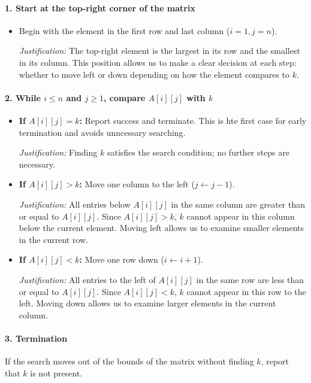 \documentclass[12pt]{article}
\begin{document}
\begin{enumerate}
\paragraph{1. Start at the top-right corner of the matrix}  

\begin{itemize}
    \item Begin with the element in the first row and last column (\(i=1, j=n\)).

    \emph{Justification:} The top-right element is the largest in its row and the smallest in its column. This position allows us to make a clear decision at each step: whether to move left or down depending on how the element compares to \(k\).
    
\end{itemize}

\paragraph{2. While \(i \le n\) and \(j \ge 1\), compare \(A[i][j]\) with \(k\)}

\begin{itemize}
\item \textbf{If \(A[i][j] = k\):} Report success and terminate. This is hte first case for early termination and avoids unncessary searching.

\emph{Justification:} Finding \(k\) satisfies the search condition; no further steps are necessary.
  
\item \textbf{If \(A[i][j] > k\):} Move one column to the left (\(j \gets j-1\)).  

\emph{Justification:}  
All entries below \(A[i][j]\) in the same column are greater than or equal to \(A[i][j]\). Since \(A[i][j] > k\), \(k\) cannot appear in this column below the current element. Moving left allows us to examine smaller elements in the current row.
  
\item \textbf{If \(A[i][j] < k\):} Move one row down (\(i \gets i+1\)).  

\emph{Justification:}  
All entries to the left of \(A[i][j]\) in the same row are less than or equal to \(A[i][j]\). Since \(A[i][j] < k\), \(k\) cannot appear in this row to the left. Moving down allows us to examine larger elements in the current column.
\end{itemize}

\paragraph{3. Termination}  
If the search moves out of the bounds of the matrix without finding \(k\), report that \(k\) is not present.


\end{enumerate}
\end{document}
